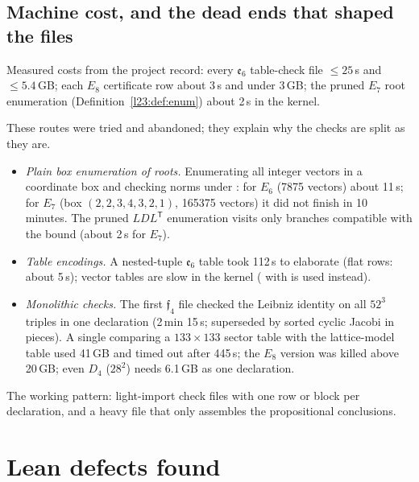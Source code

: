 \subsection{Machine cost, and the dead ends that shaped the files}
Measured costs from the project record: every $\mathfrak e_6$ table-check file $\le25$\,s and $\le5.4$\,GB; each $E_8$ certificate row about
3\,s and under 3\,GB; the pruned $E_7$ root enumeration (Definition~\ref{l23:def:enum}) about 2\,s in the kernel.

\begin{warning}[title={Dead ends: kernel cost}]\label{l23:warn:kernel}
These routes were tried and abandoned; they explain why the checks are split as they are.
\begin{itemize}
\item \emph{Plain box enumeration of roots.} Enumerating all integer vectors in a coordinate box and checking norms under
  : for $E_6$ (7875 vectors) about 11\,s; for $E_7$ (box $(2,2,3,4,3,2,1)$, 165375 vectors) it did not finish in
  10 minutes. The pruned $LDL^{\mathsf T}$ enumeration visits only branches compatible with the bound (about 2\,s for $E_7$).
\item \emph{Table encodings.} A nested-tuple $\mathfrak e_6$ table took 112\,s to elaborate (flat  rows: about 5\,s); \lean{![…]}
  vector tables are slow in the kernel ( with  is used instead).
\item \emph{Monolithic checks.} The first $\mathfrak f_4$ file checked the Leibniz identity on all $52^3$ triples in one declaration (2\,min
  15\,s; superseded by sorted cyclic Jacobi in pieces). A single  comparing a $133\times133$ sector table with the lattice-model
  table used 41\,GB and timed out after 445\,s; the $E_8$ version was killed above 20\,GB; even $D_4$ ($28^2$) needs 6.1\,GB as one declaration.
\end{itemize}
The working pattern: light-import check files with one row or block per declaration, and a heavy file that only assembles the
propositional conclusions.
\end{warning}

\section{Lean defects found}\label{l23:sec:defects}

